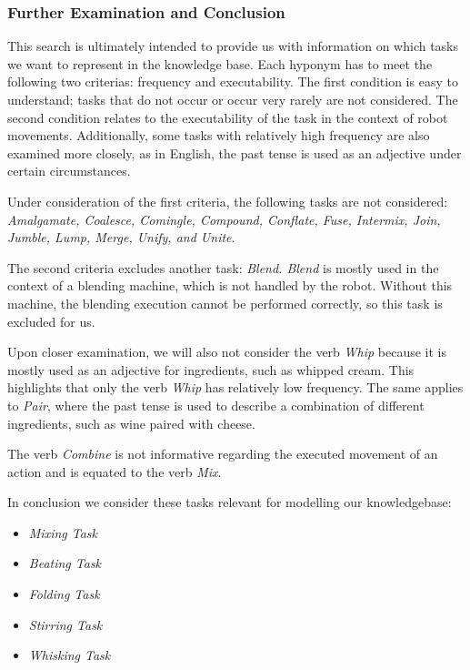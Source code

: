 \subsubsection{Further Examination and Conclusion}
This search is ultimately intended to provide us with information on which tasks we want to represent in the knowledge base. 
Each hyponym has to meet the following two criterias: frequency and executability. 
The first condition is easy to understand; tasks that do not occur or occur very rarely are not considered. 
The second condition relates to the executability of the task in the context of robot movements. 
Additionally, some tasks with relatively high frequency are also examined more closely, as in English, the past tense is used as an adjective under certain circumstances.

Under consideration of the first criteria, the following tasks are not considered: \textit{Amalgamate, Coalesce, Comingle, Compound, Conflate, Fuse, Intermix, Join, Jumble, Lump, Merge, Unify, and Unite}.

The second criteria excludes another task: \textit{Blend. Blend} is mostly used in the context of a blending machine, which is not handled by the robot. Without this machine, the blending execution cannot be performed correctly, so this task is excluded for us.

Upon closer examination, we will also not consider the verb \textit{Whip} because it is mostly used as an adjective for ingredients, such as whipped cream. This highlights that only the verb \textit{Whip} has relatively low frequency. The same applies to \textit{Pair}, where the past tense is used to describe a combination of different ingredients, such as wine paired with cheese.

The verb \textit{Combine} is not informative regarding the executed movement of an action and is equated to the verb \textit{Mix}.

In conclusion we consider these tasks relevant for modelling our knowledgebase:
\begin{itemize}
  \item \textit{Mixing Task}
  \item \textit{Beating Task}
  \item \textit{Folding Task}
  \item \textit{Stirring Task}
  \item \textit{Whisking Task}
\end{itemize}


